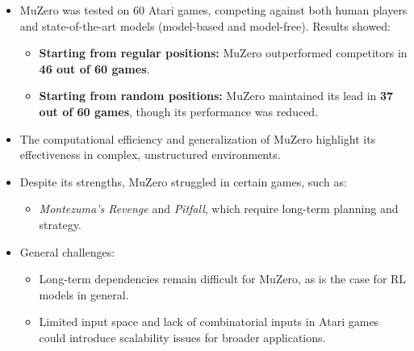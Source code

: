 \begin{itemize}
    \item MuZero was tested on 60 Atari games, competing against both human players and
          state-of-the-art models (model-based and model-free). Results showed:
          \begin{itemize}
              \item \textbf{Starting from regular positions:} MuZero outperformed competitors in \textbf{46 out of 60 games}.
              \item \textbf{Starting from random positions:} MuZero maintained its lead in \textbf{37 out of 60 games}, though its performance was reduced.
          \end{itemize}
    \item The computational efficiency and generalization of MuZero highlight its
          effectiveness in complex, unstructured environments.
\end{itemize}

\begin{itemize}
    \item Despite its strengths, MuZero struggled in certain games, such as:
          \begin{itemize}
              \item \emph{Montezuma's Revenge} and \emph{Pitfall}, which require long-term planning and strategy.
          \end{itemize}
    \item General challenges:
          \begin{itemize}
              \item Long-term dependencies remain difficult for MuZero, as is the case for RL
                    models in general.
              \item Limited input space and lack of combinatorial inputs in Atari games could
                    introduce scalability issues for broader applications.\cite{mz1}
          \end{itemize}
\end{itemize}

